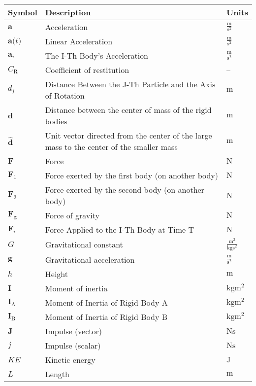\documentclass[12pt]{article}
\begin{document}
\begin{longtabu}{l X[l] l}
\toprule
\textbf{Symbol} & \textbf{Description} & \textbf{Units}
\\
\midrule
\endhead
$\mathbf{a}$ & Acceleration & $\frac{\text{m}}{\text{s}^{2}}$
\\
$\mathbf{a}\text{(}t\text{)}$ & Linear Acceleration & $\frac{\text{m}}{\text{s}^{2}}$
\\
${\mathbf{a}_{i}}$ & The I-Th Body's Acceleration & $\frac{\text{m}}{\text{s}^{2}}$
\\
${C_{\text{R}}}$ & Coefficient of restitution & --
\\
${d_{j}}$ & Distance Between the J-Th Particle and the Axis of Rotation & ${\text{m}}$
\\
$\mathbf{d}$ & Distance between the center of mass of the rigid bodies & ${\text{m}}$
\\
$\mathbf{\hat{d}}$ & Unit vector directed from the center of the large mass to the center of the smaller mass & ${\text{m}}$
\\
$\mathbf{F}$ & Force & ${\text{N}}$
\\
${\mathbf{F}_{1}}$ & Force exerted by the first body (on another body) & ${\text{N}}$
\\
${\mathbf{F}_{2}}$ & Force exerted by the second body (on another body) & ${\text{N}}$
\\
${\mathbf{F}_{\mathbf{g}}}$ & Force of gravity & ${\text{N}}$
\\
${\mathbf{F}_{i}}$ & Force Applied to the I-Th Body at Time T & ${\text{N}}$
\\
$G$ & Gravitational constant & $\frac{\text{m}^{3}}{\text{kg}\text{s}^{2}}$
\\
$\mathbf{g}$ & Gravitational acceleration & $\frac{\text{m}}{\text{s}^{2}}$
\\
$h$ & Height & ${\text{m}}$
\\
$\mathbf{I}$ & Moment of inertia & $\text{kg}\text{m}^{2}$
\\
${\mathbf{I}_{\text{A}}}$ & Moment of Inertia of Rigid Body A & $\text{kg}\text{m}^{2}$
\\
${\mathbf{I}_{\text{B}}}$ & Moment of Inertia of Rigid Body B & $\text{kg}\text{m}^{2}$
\\
$\mathbf{J}$ & Impulse (vector) & $\text{N}\text{s}$
\\
$j$ & Impulse (scalar) & $\text{N}\text{s}$
\\
$KE$ & Kinetic energy & ${\text{J}}$
\\
$L$ & Length & ${\text{m}}$

\end{longtabu}
\end{document}
